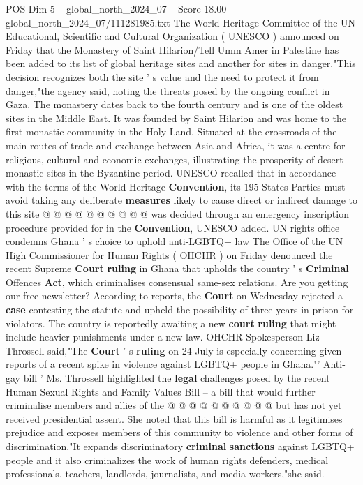 \begin{textsample}{POS Dim 5 – global\_north\_2024\_07 – Score 18.00 – global\_north\_2024\_07/111281985.txt}  \label{ex:f5_pos_303}
The World Heritage Committee of the UN Educational, Scientific and Cultural Organization ( UNESCO ) announced on Friday that the Monastery of Saint Hilarion/Tell Umm Amer in Palestine has been added to its list of global heritage sites and another for sites in danger."This decision recognizes both the site ' s value and the need to protect it from danger,"the agency said, noting the threats posed by the ongoing conflict in Gaza.
The monastery dates back to the fourth century and is one of the oldest sites in the Middle East.
It was founded by Saint Hilarion and was home to the first monastic community in the Holy Land.
Situated at the crossroads of the main routes of trade and exchange between Asia and Africa, it was a centre for religious, cultural and economic exchanges, illustrating the prosperity of desert monastic sites in the Byzantine period.
UNESCO recalled that in accordance with the terms of the World Heritage \textbf{Convention}, its 195 States Parties must avoid taking any deliberate \textbf{measures} likely to cause direct or indirect damage to this site @ @ @ @ @ @ @ @ @ @ was decided through an emergency inscription procedure provided for in the \textbf{Convention}, UNESCO added.
UN rights office condemns Ghana ' s choice to uphold anti-LGBTQ+ law The Office of the UN High Commissioner for Human Rights ( OHCHR ) on Friday denounced the recent Supreme \textbf{Court} \textbf{ruling} in Ghana that upholds the country ' s \textbf{Criminal} Offences \textbf{Act}, which criminalises consensual same-sex relations.
Are you getting our free newsletter?
According to reports, the \textbf{Court} on Wednesday rejected a \textbf{case} contesting the statute and upheld the possibility of three years in prison for violators.
The country is reportedly awaiting a new \textbf{court} \textbf{ruling} that might include heavier punishments under a new law.
OHCHR Spokesperson Liz Throssell said,"The \textbf{Court} ' s \textbf{ruling} on 24 July is especially concerning given reports of a recent spike in violence against LGBTQ+ people in Ghana."' Anti-gay bill ' Ms.
Throssell highlighted the \textbf{legal} challenges posed by the recent Human Sexual Rights and Family Values Bill -- a bill that would further criminalise members and allies of the @ @ @ @ @ @ @ @ @ @ but has not yet received presidential assent.
She noted that this bill is harmful as it legitimises prejudice and exposes members of this community to violence and other forms of discrimination."It expands discriminatory \textbf{criminal} \textbf{sanctions} against LGBTQ+ people and it also criminalizes the work of human rights defenders, medical professionals, teachers, landlords, journalists, and media workers,"she said.

\end{textsample}
